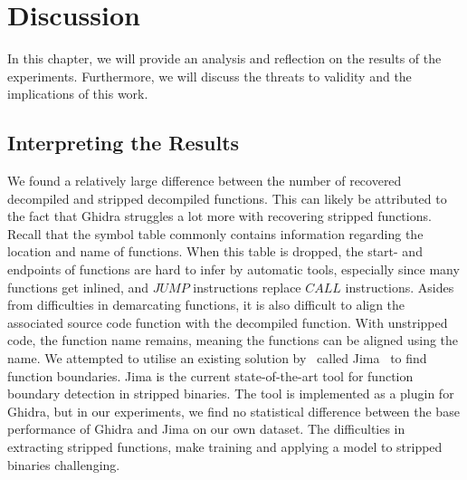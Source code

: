 \chapter{Discussion}
\label{discussion}
In this chapter, we will provide an analysis and reflection on the results of the experiments. Furthermore, we will discuss the threats to validity and the implications of this work.

\section{Interpreting the Results}
We found a relatively large difference between the number of recovered decompiled and stripped decompiled functions. This can likely be attributed to the fact that Ghidra struggles a lot more with recovering stripped functions. Recall that the symbol table commonly contains information regarding the location and name of functions. When this table is dropped, the start- and endpoints of functions are hard to infer by automatic tools, especially since many functions get inlined, and \(JUMP\) instructions replace \(CALL\) instructions. Asides from difficulties in demarcating functions, it is also difficult to align the associated source code function with the decompiled function. With unstripped code, the function name remains, meaning the functions can be aligned using the name. We attempted to utilise an existing solution by~\citeauthor{FunctionBoundaryDetection} called Jima~\cite{FunctionBoundaryDetection} to find function boundaries. Jima is the current state-of-the-art tool for function boundary detection in stripped binaries. The tool is implemented as a plugin for Ghidra, but in our experiments, we find no statistical difference between the base performance of Ghidra and Jima on our own dataset. The difficulties in extracting stripped functions, make training and applying a model to stripped binaries challenging.

